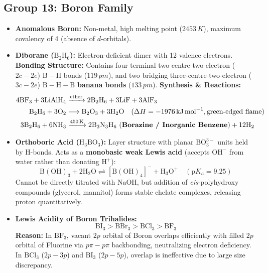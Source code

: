 \documentclass[10pt,a4paper]{article}
\begin{document}
\subsection{Group 13: Boron Family}
\begin{itemize}
  \item \textbf{Anomalous Boron:} Non-metal, high melting point ($2453\,\si{K}$), maximum covalency of 4 (absence of $d$-orbitals).
  \item \textbf{Diborane ($\mathrm{B_2H_6}$):}
  Electron-deficient dimer with 12 valence electrons.
  \textbf{Bonding Structure:} Contains four terminal two-centre-two-electron ($2c-2e$) $\mathrm{B-H}$ bonds ($119\,\si{pm}$), and two bridging three-centre-two-electron ($3c-2e$) $\mathrm{B-H-B}$ \textbf{banana bonds} ($133\,\si{pm}$).
  \textbf{Synthesis \& Reactions:}
  \begin{align}
    4\mathrm{BF_3} + 3\mathrm{LiAlH_4} &\xrightarrow{\text{ether}} 2\mathrm{B_2H_6} + 3\mathrm{LiF} + 3\mathrm{AlF_3} \\
    \mathrm{B_2H_6} + 3\mathrm{O_2} &\longrightarrow \mathrm{B_2O_3} + 3\mathrm{H_2O} \quad (\Delta H = -1976\,\si{kJ.mol^{-1}}, \text{green-edged flame}) \\
    3\mathrm{B_2H_6} + 6\mathrm{NH_3} &\xrightarrow{450\,\si{K}} 2\mathrm{B_3N_3H_6}\text{ (\textbf{Borazine / Inorganic Benzene})} + 12\mathrm{H_2}
  \end{align}
  \item \textbf{Orthoboric Acid ($\mathrm{H_3BO_3}$):} Layer structure with planar $\mathrm{BO_3^{3-}}$ units held by H-bonds. Acts as a \textbf{monobasic weak Lewis acid} (accepts $\mathrm{OH^-}$ from water rather than donating $\mathrm{H}^+$):
  \begin{equation}
    \mathrm{B(OH)_3} + 2\mathrm{H_2O} \rightleftharpoons [\mathrm{B(OH)_4}]^- + \mathrm{H_3O}^+ \quad (\text{p}K_a = 9.25)
  \end{equation}
  Cannot be directly titrated with $\mathrm{NaOH}$, but addition of \textit{cis}-polyhydroxy compounds (glycerol, mannitol) forms stable chelate complexes, releasing proton quantitatively.
  \item \textbf{Lewis Acidity of Boron Trihalides:}
  \begin{equation}
    \mathbf{\mathrm{BI_3 > BBr_3 > BCl_3 > BF_3}}
  \end{equation}
  \textbf{Reason:} In $\mathrm{BF_3}$, vacant $2p$ orbital of Boron overlaps efficiently with filled $2p$ orbital of Fluorine via $p\pi-p\pi$ backbonding, neutralizing electron deficiency. In $\mathrm{BCl_3}$ ($2p-3p$) and $\mathrm{BI_3}$ ($2p-5p$), overlap is ineffective due to large size discrepancy.
\end{itemize}
\end{document}
